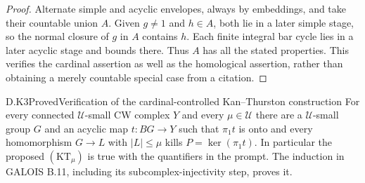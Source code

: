 \begin{proof}
Alternate simple and acyclic envelopes, always by embeddings,
and take their countable union $A$. Given $g\ne1$ and $h\in A$,
both lie in a later simple stage, so the normal closure of $g$
in $A$ contains $h$. Each finite integral bar cycle lies in a
later acyclic stage and bounds there. Thus $A$ has all the stated
properties. This verifies the cardinal assertion as well as the
homological assertion, rather than obtaining a merely countable
special case from a citation.
\end{proof}

\begin{result}{D.K3}{Proved}{Verification of the cardinal-controlled Kan--Thurston construction}
For every connected $\mathcal U$-small CW complex $Y$ and every
$\mu\in\mathcal U$ there are a $\mathcal U$-small group $G$ and
an acyclic map $t:BG\to Y$ such that $\pi_1t$ is onto and every
homomorphism $G\to L$ with $|L|\leq\mu$ kills
$P=\ker(\pi_1t)$. In particular the proposed $(\mathrm{KT}_\mu)$
is true with the quantifiers in the prompt. The induction in
GALOIS B.11, including its subcomplex-injectivity step, proves it.
\end{result}

